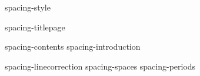 
%
%

\environment spacing-style

\startdocument

    \component spacing-titlepage

    \startfrontmatter
        \component spacing-contents
        \component spacing-introduction
    \stopfrontmatter

    \startbodymatter
        \component spacing-linecorrection
        \component spacing-spaces
        \component spacing-periods
    \stopbodymatter

\stopdocument
